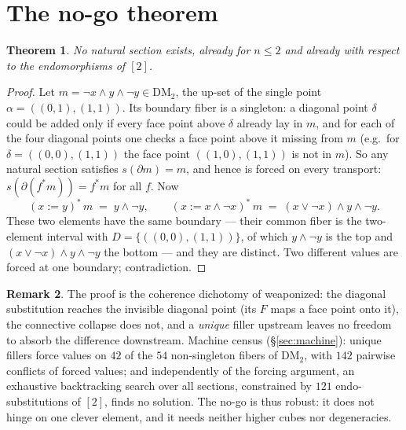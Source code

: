 \documentclass[11pt]{amsart}
\newtheorem{thm}{Theorem}[section]
\theoremstyle{definition}
\newtheorem{rem}[thm]{Remark}
\newcommand{\DM}{\mathrm{DM}}
\newcommand{\bnd}{\partial}
\begin{document}
\section{The no-go theorem}
\label{sec:nogo}

\begin{thm}
  \label{thm:nogo}
  No natural section exists, already for $n \leq 2$ and already
  with respect to the endomorphisms of $[2]$.
\end{thm}

\begin{proof}
  Let $m = \neg x \wedge y \wedge \neg y \in \DM_2$, the up-set of
  the single point $\alpha = ((0,1), (1,1))$.  Its boundary fiber is
  a singleton: a diagonal point $\delta$ could be added only if
  every face point above $\delta$ already lay in $m$, and for each
  of the four diagonal points one checks a face point above it
  missing from $m$ (e.g.\ for $\delta = ((0,0),(1,1))$ the face
  point $((1,0),(1,1))$ is not in $m$).  So any natural section
  satisfies $s(\bnd m) = m$, and hence is forced on every
  transport: $s(\bnd(f^{*}m)) = f^{*}m$ for all $f$.  Now
  \[
    (x := y)^{*}\, m \;=\; y \wedge \neg y,
    \qquad
    (x := x \wedge \neg x)^{*}\, m
    \;=\; (x \vee \neg x) \wedge y \wedge \neg y .
  \]
  These two elements have the same boundary --- their common fiber
  is the two-element interval with
  $D = \{((0,0),(1,1))\}$, of which $y \wedge \neg y$ is the top
  and $(x \vee \neg x) \wedge y \wedge \neg y$ the bottom --- and
  they are distinct.  Two different values are forced at one
  boundary; contradiction.
\end{proof}

\begin{rem}
  The proof is the coherence dichotomy of \cite{StrictDM} weaponized:
  the diagonal substitution reaches the invisible diagonal point
  (its $F$ maps a face point onto it), the connective collapse does
  not, and a \emph{unique} filler upstream leaves no freedom to
  absorb the difference downstream.  Machine census
  (\S\ref{sec:machine}): unique fillers force values on $42$ of the
  $54$ non-singleton fibers of $\DM_2$, with $142$ pairwise
  conflicts of forced values; and independently of the forcing
  argument, an exhaustive backtracking search over all sections,
  constrained by $121$ endo-substitutions of $[2]$, finds no
  solution.  The no-go is thus robust: it does not hinge on one
  clever element, and it needs neither higher cubes nor
  degeneracies.
\end{rem}
\end{document}
